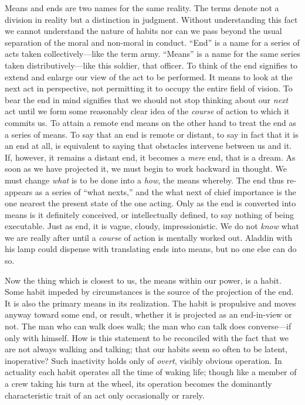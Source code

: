 \documentclass[12pt]{article}
\begin{document}
Means and ends are two names for the same reality.
The terms denote not a division in reality but a distinction
in judgment. Without understanding this fact
we cannot understand the nature of habits nor can we
pass beyond the usual separation of the moral and
non-moral in conduct. ``End'' is a name for a series
of acts taken collectively---like the term army.
``Means'' is a name for the same series taken distributively---like
this soldier, that officer. To think of the
end signifies to extend and enlarge our view of the act
to be performed. It means to look at the next act in
perspective, not permitting it to occupy the entire field
of vision. To bear the end in mind signifies that we
should not stop thinking about our \emph{next} act until we
form some reasonably clear idea of the \emph{course} of action
to which it commits us. To attain a remote end means
on the other hand to treat the end as a series of means.
To say that an end is remote or distant, to say in fact
that it is an end at all, is equivalent to saying that
obstacles intervene between us and it. If, however, it
remains a distant end, it becomes a \emph{mere} end, that is a
dream. As soon as we have projected it, we must begin
to work backward in thought. We must change \emph{what}
is to be done into a \emph{how}, the means whereby. The
end thus re-appears as a series of ``what nexts,'' and the
what next of chief importance is the one nearest the
present state of the one acting. Only as the end is
converted into means is it definitely conceived, or intellectually
defined, to say nothing of being executable.
Just as end, it is vague, cloudy, impressionistic. We
do not \emph{know} what we are really after until a \emph{course} of
action is mentally worked out. Aladdin with his lamp
could dispense with translating ends into means, but no
one else can do so.

Now the thing which is closest to us, the means
within our power, is a habit. Some habit impeded by
circumstances is the source of the projection of the end.
It is also the primary means in its realization. The
habit is propulsive and moves anyway toward some end,
or result, whether it is projected as an end-in-view or
not. The man who can walk does walk; the man who
can talk does converse---if only with himself. How is
this statement to be reconciled with the fact that we
are not always walking and talking; that our habits
seem so often to be latent, inoperative? Such inactivity
holds only of \emph{overt}, visibly obvious operation. In
actuality each habit operates all the time of waking
life; though like a member of a crew taking his turn
at the wheel, its operation becomes the dominantly
characteristic trait of an act only occasionally or
rarely.
\end{document}
